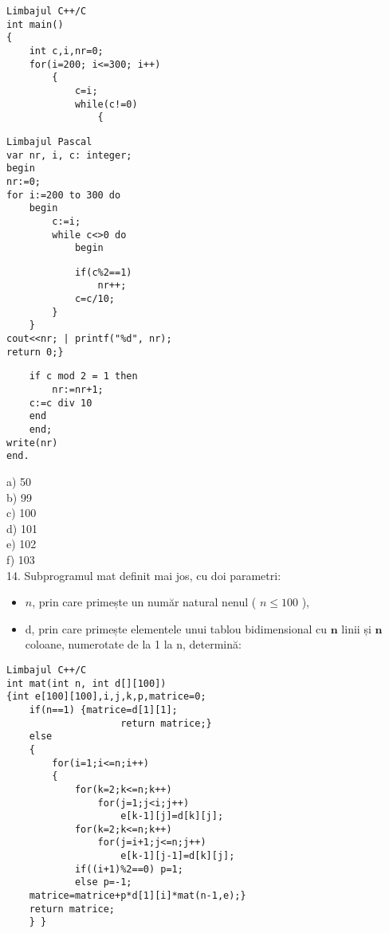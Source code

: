 \begin{verbatim}
Limbajul C++/C
int main()
{
    int c,i,nr=0;
    for(i=200; i<=300; i++)
        {
            c=i;
            while(c!=0)
                {
\end{verbatim}

\begin{verbatim}
Limbajul Pascal
var nr, i, c: integer;
begin
nr:=0;
for i:=200 to 300 do
    begin
        c:=i;
        while c<>0 do
            begin
\end{verbatim}

\begin{verbatim}
            if(c%2==1)
                nr++;
            c=c/10;
        }
    }
cout<<nr; | printf("%d", nr);
return 0;}
\end{verbatim}

\begin{verbatim}
    if c mod 2 = 1 then
        nr:=nr+1;
    c:=c div 10
    end
    end;
write(nr)
end.
\end{verbatim}

a) 50\\
b) 99\\
c) 100\\
d) 101\\
e) 102\\
f) 103\\
14. Subprogramul mat definit mai jos, cu doi parametri:

\begin{itemize}
  \item $n$, prin care primește un număr natural nenul ( $n \leq 100$ ),
  \item d, prin care primește elementele unui tablou bidimensional cu $\mathbf{n}$ linii și $\mathbf{n}$ coloane, numerotate de la 1 la n, determină:
\end{itemize}

\begin{verbatim}
Limbajul C++/C
int mat(int n, int d[][100])
{int e[100][100],i,j,k,p,matrice=0;
    if(n==1) {matrice=d[1][1];
                    return matrice;}
    else
    {
        for(i=1;i<=n;i++)
        {
            for(k=2;k<=n;k++)
                for(j=1;j<i;j++)
                    e[k-1][j]=d[k][j];
            for(k=2;k<=n;k++)
                for(j=i+1;j<=n;j++)
                    e[k-1][j-1]=d[k][j];
            if((i+1)%2==0) p=1;
            else p=-1;
    matrice=matrice+p*d[1][i]*mat(n-1,e);}
    return matrice;
    } }
\end{verbatim}

